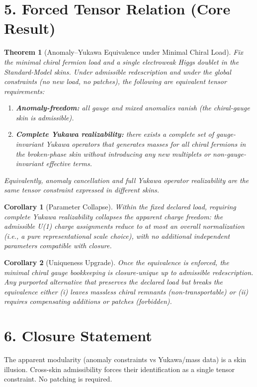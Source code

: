 ﻿\documentclass[11pt]{article}
\newtheorem{theorem}{Theorem}
\newtheorem{corollary}{Corollary}
\begin{document}
\section*{5. Forced Tensor Relation (Core Result)}
\begin{theorem}[Anomaly--Yukawa Equivalence under Minimal Chiral Load]
Fix the minimal chiral fermion load and a single electroweak Higgs doublet in the Standard-Model skins.
Under admissible redescription and under the global constraints (no new load, no patches),
the following are equivalent tensor requirements:
\begin{enumerate}
\item \textbf{Anomaly-freedom:} all gauge and mixed anomalies vanish (the chiral-gauge skin is admissible).
\item \textbf{Complete Yukawa realizability:} there exists a complete set of gauge-invariant Yukawa operators
that generates masses for all chiral fermions in the broken-phase skin without introducing any new multiplets
or non-gauge-invariant effective terms.
\end{enumerate}
Equivalently, anomaly cancellation and full Yukawa operator realizability are the same tensor constraint expressed in different skins.
\end{theorem}

\begin{corollary}[Parameter Collapse]
Within the fixed declared load, requiring complete Yukawa realizability collapses the apparent charge freedom:
the admissible U(1) charge assignments reduce to at most an overall normalization
(i.e., a pure representational scale choice), with no additional independent parameters compatible with closure.
\end{corollary}

\begin{corollary}[Uniqueness Upgrade]
Once the equivalence is enforced, the minimal chiral gauge bookkeeping is closure-unique up to admissible redescription.
Any purported alternative that preserves the declared load but breaks the equivalence
either (i) leaves massless chiral remnants (non-transportable) or (ii) requires compensating additions or patches (forbidden).
\end{corollary}

\section*{6. Closure Statement}
The apparent modularity (anomaly constraints vs Yukawa/mass data) is a skin illusion.
Cross-skin admissibility forces their identification as a single tensor constraint.
No patching is required.
\end{document}
